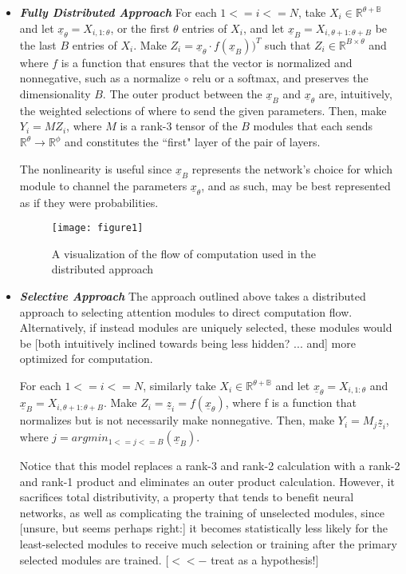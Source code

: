 \documentclass[12pt]{article}
\begin{document}
\begin{itemize}

\item \label{Fully Distributed} \textit{\textbf{Fully Distributed Approach}} For each $1<=i<=N$, take $X_i \in \mathbb{R^{\theta+B}}$ and let $\underline{x}_\theta = X_{i,1:\theta}$, or the first $\theta$ entries of $X_i$, and let $\underline{x}_B = X_{i, \theta+1:\theta+B}$ be the last $B$ entries of $X_i$.  Make $Z_i = \underline{x}_\theta \cdot f(\underline{x}_B))^{T}$ such that $Z_i \in \mathbb{R}^{B\times\theta}$ and where $f$ is a function that ensures that the vector is normalized and nonnegative, such as a normalize $\circ$ relu or a softmax, and preserves the dimensionality $B$.  The outer product between the $\underline{x}_B$ and $\underline{x}_\theta$ are, intuitively, the weighted selections of where to send the given parameters. Then, make $Y_i = MZ_i$, where $M$ is a rank-3 tensor of the $B$ modules that each sends $\mathbb{R}^{\theta}\rightarrow\mathbb{R}^{\phi}$ and constitutes the ``first" layer of the pair of layers.
\par The nonlinearity is useful since $\underline{x}_B$ represents the network's choice for which module to channel the parameters $\underline{x}_\theta$, and as such, may be best represented as if they were probabilities.\par
\begin{figure}[h]
\centering
\texttt{[image: figure1]}
\centering
\caption{A visualization of the flow of computation used in the distributed approach}
\end{figure}

\item \label{Selective Approach} \textit{\textbf{Selective Approach}} The approach outlined above takes a distributed approach to selecting attention modules to direct computation flow.  Alternatively, if instead modules are uniquely selected, these modules would be [both intuitively inclined towards being less hidden? ... and] more optimized for computation.\par
For each $1<=i<=N$, similarly take $X_i \in \mathbb{R^{\theta+B}}$ and let $\underline{x}_\theta = X_{i,1:\theta}$ and $\underline{x}_B = X_{i, \theta+1:\theta+B}$.  Make $Z_i = \underline{z}_i = f(\underline{x}_\theta)$, where f is a function that normalizes but is not necessarily make nonnegative.  Then, make $Y_i = M_j\underline{z}_i$, where $j = argmin_{1<=j<=B} ( \underline{x}_B )$.  \par
Notice that this model replaces a rank-3 and rank-2 calculation with a rank-2 and rank-1 product and eliminates an outer product calculation.  However, it sacrifices total distributivity, a property that tends to benefit neural networks, as well as complicating the training of unselected modules, since [unsure, but seems perhaps right:] it becomes statistically less likely for the least-selected modules to receive much selection or training after the primary selected modules are trained. [$<<-$ treat as a hypothesis!] \par



\end{itemize}
\end{document}
